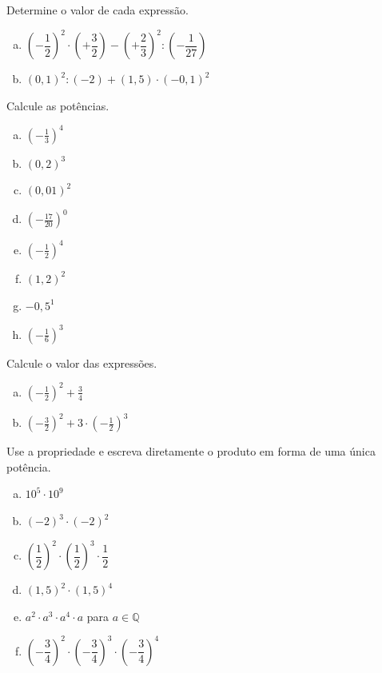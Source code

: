 \item Determine o valor de cada expressão.
\begin{enumerate}[a)]
	\item $\left(-\dfrac{1}{2}\right)^2\cdot \left(+\dfrac{3}{2}\right) - \left(+\dfrac{2}{3}\right)^2 : \left(-\dfrac{1}{27}\right)$
	\item $(0,1)^2:(-2) + (1,5)\cdot (-0,1)^2$
\end{enumerate}

\item Calcule as potências.
\begin{multicols}{4}
\begin{enumerate}[a)]
	\item $\left(-\displaystyle\frac{1}{3}\right)^4$
	\item $(0,2)^3$
	\item $(0,01)^2$
	\item $\left(-\displaystyle\frac{17}{20}\right)^0$
	\item $\left(-\displaystyle\frac{1}{2}\right)^4$
	\item $(1,2)^2$
	\item $-0,5^1$
	\item $\left(-\displaystyle\frac{1}{6}\right)^3$
\end{enumerate}
\end{multicols}

\item Calcule o valor das expressões.
\begin{multicols}{2}
\begin{enumerate}[a)]
	\item $\left(-\displaystyle\frac{1}{2}\right)^2 + \displaystyle\frac{3}{4}$
	\item $\left(-\displaystyle\frac{3}{2}\right)^2 + 3\cdot\left(-\displaystyle\frac{1}{2}\right)^3$
\end{enumerate}
\end{multicols}

\item Use a propriedade e escreva diretamente o produto em forma de uma única potência.
\begin{multicols}{2}
\begin{enumerate}[a)]
	\item $10^5\cdot 10^9$
	\item $(-2)^3\cdot (-2)^2$
	\item $\left(\dfrac{1}{2}\right)^2 \cdot \left(\dfrac{1}{2}\right)^3 \cdot \dfrac{1}{2}$
	\item $(1,5)^2 \cdot (1,5)^4$
	\item $ a^2 \cdot a^3 \cdot a^4 \cdot a$ para $a \in \mathbb{Q}$
	\item $\left(-\dfrac{3}{4}\right)^2 \cdot \left(-\dfrac{3}{4}\right)^3 \cdot \left(- \dfrac{3}{4}\right)^4$
\end{enumerate}
\end{multicols}

